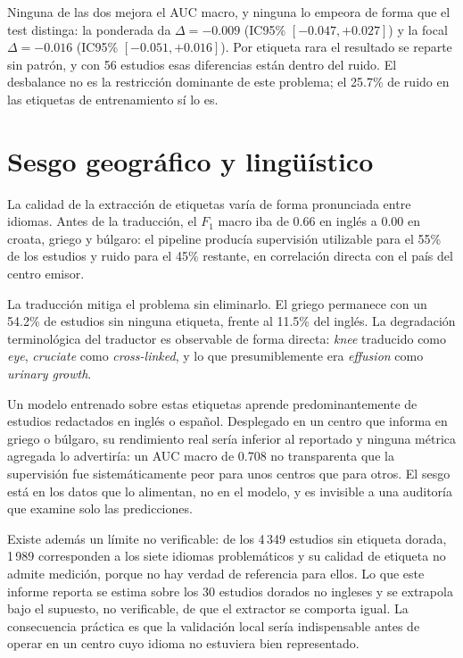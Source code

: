 \documentclass{article}
\begin{document}
Ninguna de las dos mejora el AUC macro, y ninguna lo empeora de forma que el test
distinga: la ponderada da $\Delta = -0.009$ (IC95\%
$[-0.047, +0.027]$) y la focal
$\Delta = -0.016$ (IC95\% $[-0.051, +0.016]$).
Por etiqueta rara el resultado se reparte sin patrón, y con 56 estudios esas
diferencias están dentro del ruido. El desbalance no es la restricción dominante
de este problema; el 25.7\% de ruido en las etiquetas de entrenamiento sí lo es.

\section{Sesgo geográfico y lingüístico}

La calidad de la extracción de etiquetas varía de forma pronunciada entre
idiomas. Antes de la traducción, el $F_1$ macro iba de 0.66 en inglés a 0.00 en
croata, griego y búlgaro: el pipeline producía supervisión utilizable para el
55\% de los estudios y ruido para el 45\% restante, en correlación directa con el
país del centro emisor.

La traducción mitiga el problema sin eliminarlo. El griego permanece con un
54.2\% de estudios sin ninguna etiqueta, frente al 11.5\% del inglés. La
degradación terminológica del traductor es observable de forma directa:
\emph{knee} traducido como \emph{eye}, \emph{cruciate} como \emph{cross-linked},
y lo que presumiblemente era \emph{effusion} como \emph{urinary growth}.

Un modelo entrenado sobre estas etiquetas aprende predominantemente de estudios
redactados en inglés o español. Desplegado en un centro que informa en griego o
búlgaro, su rendimiento real sería inferior al reportado y ninguna métrica
agregada lo advertiría: un AUC macro de 0.708 no transparenta que la supervisión
fue sistemáticamente peor para unos centros que para otros. El sesgo está en los
datos que lo alimentan, no en el modelo, y es invisible a una auditoría que
examine solo las predicciones.

Existe además un límite no verificable: de los 4\,349 estudios sin etiqueta
dorada, 1\,989 corresponden a los siete idiomas problemáticos y su calidad de
etiqueta no admite medición, porque no hay verdad de referencia para ellos. Lo
que este informe reporta se estima sobre los 30 estudios dorados no ingleses y se
extrapola bajo el supuesto, no verificable, de que el extractor se comporta
igual. La consecuencia práctica es que la validación local sería indispensable
antes de operar en un centro cuyo idioma no estuviera bien representado.
\end{document}
